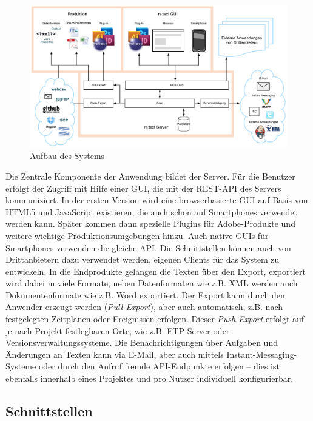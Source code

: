 \begin{figure}[htb]
\begin{center}
\includegraphics[width=\textwidth]{media/System.pdf}
\caption{Aufbau des Systems}
\label{chart:1}
\end{center}
\end{figure}

Die Zentrale Komponente der Anwendung bildet der Server. Für die Benutzer erfolgt der Zugriff mit Hilfe einer GUI, die mit der REST-API des Servers kommuniziert. In der ersten Version wird eine browserbasierte GUI auf Basis von HTML5 und JavaScript existieren, die auch schon auf Smartphones verwendet werden kann. Später kommen dann spezielle Plugins für Adobe-Produkte und weitere wichtige Produktionsumgebungen hinzu. Auch native GUIs für Smartphones verwenden die gleiche API. Die Schnittstellen können auch von Drittanbietern dazu verwendet werden, eigenen Clients für das System zu entwickeln. In die Endprodukte gelangen die Texten über den Export, exportiert wird dabei in viele Formate, neben Datenformaten wie z.B. XML werden auch Dokumentenformate wie z.B. Word exportiert. Der Export kann durch den Anwender erzeugt werden (\emph{Pull-Export}), aber auch automatisch, z.B. nach festgelegten Zeitplänen oder Ereignissen erfolgen. Dieser \emph{Push-Export} erfolgt auf je nach Projekt festlegbaren Orte, wie z.B. FTP-Server oder Versionsverwaltungssysteme. Die Benachrichtigungen über Aufgaben und Änderungen an Texten kann via E-Mail, aber auch mittels Instant-Messaging-Systeme oder durch den Aufruf fremde API-Endpunkte erfolgen – dies ist ebenfalls innerhalb eines Projektes und pro Nutzer individuell konfigurierbar.

\subsection{Schnittstellen}

